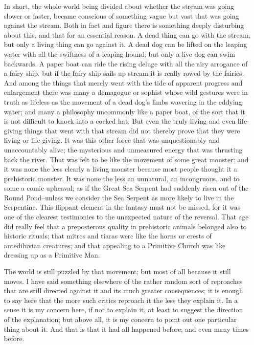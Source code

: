 In short, the whole world being divided about whether the stream was going slower or faster, became conscious of something vague but vast that was going against the stream. Both in fact and figure there is something deeply disturbing about this, and that for an essential reason. A dead thing can go with the stream, but only a living thing can go against it. A dead dog can be lifted on the leaping water with all the swiftness of a leaping hound; but only a live dog can swim backwards. A paper boat can ride the rising deluge with all the airy arrogance of a fairy ship, but if the fairy ship sails up stream it is really rowed by the fairies. And among the things that merely went with the tide of apparent progress and enlargement there was many a demagogue or sophist whose wild gestures were in truth as lifeless as the movement of a dead dog's limbs wavering in the eddying water; and many a philosophy uncommonly like a paper boat, of the sort that it is not difficult to knock into a cocked hat. But even the truly living and even life-giving things that went with that stream did not thereby prove that they were living or life-giving. It was this other force that was unquestionably and unaccountably alive; the mysterious and unmeasured energy that was thrusting back the river. That was felt to be like the movement of some great monster; and it was none the less clearly a living monster because most people thought it a prehistoric monster. It was none the less an unnatural, an incongruous, and to some a comic upheaval; as if the Great Sea Serpent had suddenly risen out of the Round Pond--unless we consider the Sea Serpent as more likely to live in the Serpentine. This flippant element in the fantasy must not be missed, for it was one of the clearest testimonies to the unexpected nature of the reversal. That age did really feel that a preposterous quality in prehistoric animals belonged also to historic rituals; that mitres and tiaras were like the horns or crests of antediluvian creatures; and that appealing to a Primitive Church was like dressing up as a Primitive Man.

The world is still puzzled by that movement; but most of all because it still moves. I have said something elsewhere of the rather random sort of reproaches that are still directed against it and its much greater consequences; it is enough to say here that the more such critics reproach it the less they explain it. In a sense it is my concern here, if not to explain it, at least to suggest the direction of the explanation; but above all, it is my concern to point out one particular thing about it. And that is that it had all happened before; and even many times before.


